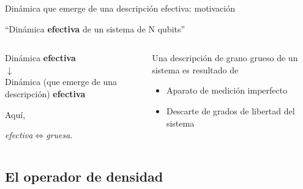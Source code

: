 \begin{frame}{Dinámica que emerge de una descripción efectiva: motivación}
    \begin{center}
        ``Dinámica \textbf{efectiva} de un sistema de N qubits''
    \end{center}
    \pause
    \begin{columns}
        \begin{column}{0.5\textwidth}
            \begin{center}
                Dinámica \textbf{efectiva}\\
                \pause
                $\downarrow$\\
                Dinámica {\tiny(que emerge de una descripción)} \textbf{efectiva}
            \end{center}
            \pause
            Aquí, 
            \begin{center}
                \textit{efectiva}$\iff$\textit{gruesa}.
            \end{center}
        \end{column}
        \pause
        \begin{column}{0.5\textwidth}
            Una descripción de grano grueso de un sistema es resultado de
            \begin{itemize}
                \item Aparato de medición imperfecto
                \item Descarte de grados de libertad del sistema
            \end{itemize}
        \end{column}
    \end{columns}
    \begin{center}
    \end{center}
\end{frame}


\subsection{El operador de densidad}


